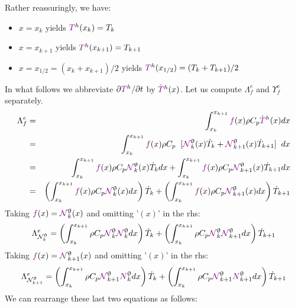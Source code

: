 Rather reassuringly, we have:
\begin{itemize}
\item $x=x_k$ yields ${\color{violet}T}^h(x_k)=T_k$
\item $x=x_{k+1}$ yields ${\color{violet}T}^h(x_{k+1})=T_{k+1}$
\item $x=x_{1/2}=(x_k+x_{k+1})/2$ yields ${\color{violet}T}^h(x_{1/2})=(T_k+T_{k+1})/2$
\end{itemize}
In what follows we abbreviate $\partial {\color{violet}T}^h/\partial t$ by $\dot{\color{violet}T}^h(x)$.
Let us compute ${\Lambda}_f^e$ and ${\Upsilon}_f^e$ separately.
\begin{eqnarray}
{\Lambda}_f^e 
&=&\int_{x_k}^{x_{k+1}} {\color{violet}f}(x) \rho C_p \dot {\color{violet}T}^h(x) dx \nonumber\\
&=& \int_{x_k}^{x_{k+1}} {\color{violet}f}(x) \rho C_p \;\;  [ {\color{violet}{\mathcal{N}}}_{k}^\uptheta(x) \dot{T}_k 
+ {\color{violet}{\mathcal{N}}}_{k+1}^\uptheta(x) \dot{T}_{k+1} ] \;\; dx  \nonumber\\
&=& \int_{x_k}^{x_{k+1}} {\color{violet}f}(x) \rho C_p {\color{violet}{\mathcal{N}}}_{k}^\uptheta(x) \dot{T}_k  dx  
+ \int_{x_k}^{x_{k+1}} {\color{violet}f}(x) 
\rho C_p {\color{violet}{\mathcal{N}}}_{k+1}^\uptheta(x) \dot{T}_{k+1}   dx \nonumber\\
&=&  \left( \int_{x_k}^{x_{k+1}} {\color{violet}f}(x) \rho C_p  
{\color{violet}{\mathcal{N}}}_{k}^\uptheta(x) dx \right) \dot{T}_k  
+ \left( \int_{x_k}^{x_{k+1}} {\color{violet}f}(x) \rho C_p 
{\color{violet}{\mathcal{N}}}_{k+1}^\uptheta(x) dx \right)  \dot{T}_{k+1}  \nonumber
\end{eqnarray}
Taking ${\color{violet}f}(x)={\color{violet}{\mathcal{N}}}_k^\uptheta(x)$ and omitting '$(x)$' in the rhs:
\[
{\Lambda}_{{\mathcal{N}}_k^\uptheta}^e=
\left( \int_{x_k}^{x_{k+1}} \rho C_p  {\color{violet}{\mathcal{N}}}_k^\uptheta 
{\color{violet}{\mathcal{N}}}_{k}^\uptheta dx \right) \dot{T}_k  
+ \left( \int_{x_k}^{x_{k+1}} \rho C_p {\color{violet}{\mathcal{N}}}_k^\uptheta 
{\color{violet}{\mathcal{N}}}_{k+1}^\uptheta dx \right)  \dot{T}_{k+1} 
\]
Taking ${\color{violet}f}(x)={\color{violet}{\mathcal{N}}}_{k+1}^\uptheta(x)$ 
and omitting '$(x)$' in the rhs:
\[
{\Lambda}_{{\mathcal{N}}_{k+1}^\uptheta}^e
= \left( \int_{x_k}^{x_{k+1}} \rho C_p {\color{violet}{\mathcal{N}}}_{k+1}^\uptheta 
{\color{violet}N}_{k}^\uptheta dx \right) \dot{T}_k  
+ \left( \int_{x_k}^{x_{k+1}} \rho C_p {\color{violet}{\mathcal{N}}}_{k+1}^\uptheta 
{\color{violet}N}_{k+1}^\uptheta dx \right)  \dot{T}_{k+1} 
\]
We can rearrange these last two equations as follows:
